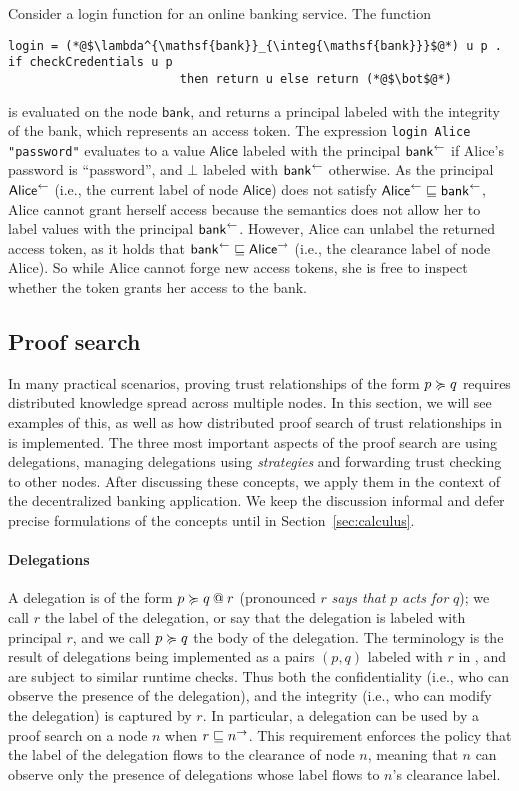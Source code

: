 Consider a login function for an online banking service. The function
\begin{lstlisting}
login = (*@$\lambda^{\mathsf{bank}}_{\integ{\mathsf{bank}}}$@*) u p . if checkCredentials u p
                        then return u else return (*@$\bot$@*)
\end{lstlisting}
is evaluated on the node $\mathsf{bank}$, and returns a principal labeled with the integrity of the bank, which represents an access token. The expression \lstinline[mathescape]!login Alice "password"! evaluates to a value $\mathsf{Alice}$ labeled with the principal $\integ{\mathsf{bank}}$ if Alice's password is ``password'', and $\bot$ labeled with $\integ{\mathsf{bank}}$ otherwise. As the principal $\integ{\mathsf{Alice}}$ (i.e., the current label of node $\mathsf{Alice}$) does not satisfy $\integ{\mathsf{Alice}} \flowsto \integ{\mathsf{bank}}$, Alice cannot grant herself access because the semantics does not allow her to label values with the principal $\integ{\mathsf{bank}}$.
However, Alice can unlabel the returned access token, as it holds that $\integ{\mathsf{bank}} \flowsto \conf{\mathsf{Alice}}$ (i.e., the clearance label of node Alice). So while Alice cannot forge new access tokens, she is free to inspect whether the token grants her access to the bank.

\subsection{Proof search}
In many practical scenarios, proving trust relationships of the form $p \actsfor q$ requires distributed knowledge spread across multiple nodes. In this section, we will see examples of this, as well as how distributed proof search of trust relationships in \lang{} is implemented. The three most important aspects of the proof search are using delegations, managing delegations using \emph{strategies} and forwarding trust checking to other nodes. After discussing these concepts, we apply them in the context of the decentralized banking application. We keep the discussion informal and defer precise formulations of the concepts until in Section~\ref{sec:calculus}.

\paragraph{Delegations}
A delegation is of the form $\lb{r}{p \actsfor q}$ (pronounced $r$ \emph{says that} $p$ \emph{acts for} $q$); we call $r$ the label of the delegation, or say that the delegation is labeled with principal $r$, and we call $p \actsfor q$ the body of the delegation. The terminology is the result of delegations being implemented as a pairs $(p, q)$ labeled with $r$ in \lang, and are subject to similar runtime checks. Thus both the confidentiality (i.e., who can observe the presence of the delegation), and the integrity (i.e., who can modify the delegation) is captured by $r$. In particular, a delegation can be used by a proof search on a node $n$ when $r \flowsto \conf{n}$. This requirement enforces the policy that the label of the delegation flows to the clearance of node $n$, meaning that $n$ can observe only the presence of delegations whose label flows to $n$'s clearance label.

